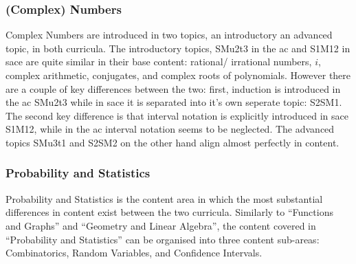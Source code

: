 \documentclass[twoside,12pt,a4paper]{report}
\begin{document}
\subsubsection{(Complex) Numbers}
Complex Numbers are introduced in two topics, an introductory an advanced topic, in both curricula. The introductory topics, SMu2t3 in the \gls{ac} and S1M12 in \gls{sace} are quite similar in their base content: rational/ irrational numbers, $i$, complex arithmetic, conjugates, and complex roots of polynomials. However there are a couple of key differences between the two: first, induction is introduced in the \gls{ac} SMu2t3 while in \gls{sace} it is separated into it's own seperate topic: S2SM1. The second key difference is that interval notation is explicitly introduced in \gls{sace} S1M12, while in the \gls{ac} interval notation seems to be neglected. The advanced topics SMu3t1 and S2SM2 on the other hand align almost perfectly in content.


\subsubsection{Probability and Statistics}
Probability and Statistics is the content area in which the most substantial differences in content exist between the two curricula. Similarly to ``Functions and Graphs'' and ``Geometry and Linear Algebra'', the content covered in ``Probability and Statistics'' can be organised into three content sub-areas: Combinatorics, Random Variables, and Confidence Intervals. 
\end{document}
